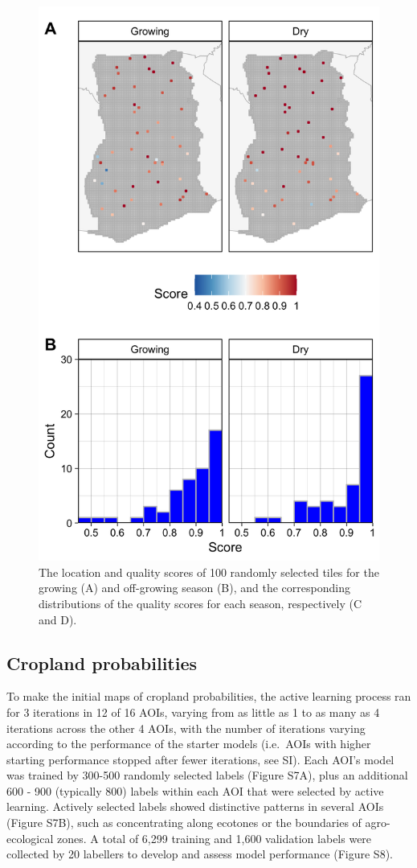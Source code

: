 \documentclass[11pt,a4paper]{article}
\begin{document}
\begin{figure}

{\centering \includegraphics[width=0.7\linewidth]{figures/figure3} 

}

\caption{The location and quality scores of 100 randomly selected tiles for the growing (A) and off-growing season (B), and the corresponding distributions of the quality scores for each season, respectively (C and D).}\label{fig:imqual}
\end{figure}

\hypertarget{cropland-probabilities}{%
\subsection{Cropland probabilities}\label{cropland-probabilities}}

To make the initial maps of cropland probabilities, the active learning
process ran for 3 iterations in 12 of 16 AOIs, varying from as little as
1 to as many as 4 iterations across the other 4 AOIs, with the number of
iterations varying according to the performance of the starter models
(i.e.~AOIs with higher starting performance stopped after fewer
iterations, see SI). Each AOI's model was trained by 300-500 randomly
selected labels (Figure S7A), plus an additional 600 - 900 (typically
800) labels within each AOI that were selected by active learning.
Actively selected labels showed distinctive patterns in several AOIs
(Figure S7B), such as concentrating along ecotones or the boundaries of
agro-ecological zones. A total of 6,299 training and 1,600 validation
labels were collected by 20 labellers to develop and assess model
performance (Figure S8).
\end{document}
